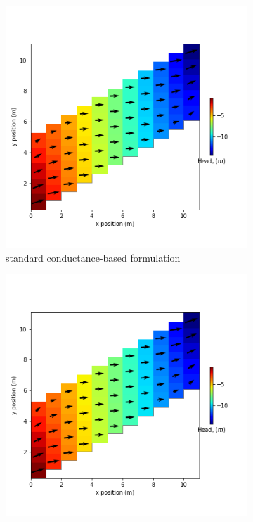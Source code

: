 \documentclass{article}
\begin{document}
\begin{figure}[H]
\centering
\begin{subfigure}{0.4\textwidth}
	\includegraphics[width=\textwidth]{../figures/disu-af-vo-s-head.png}
	\caption{standard conductance-based formulation}
	\label{fig:disu-s-nocc-head}
\end{subfigure}
\hfill
\begin{subfigure}{0.4\textwidth}
	\includegraphics[width=\textwidth]{../figures/disu-af-vo-x-head.png}

\end{subfigure}
\end{figure}
\end{document}
